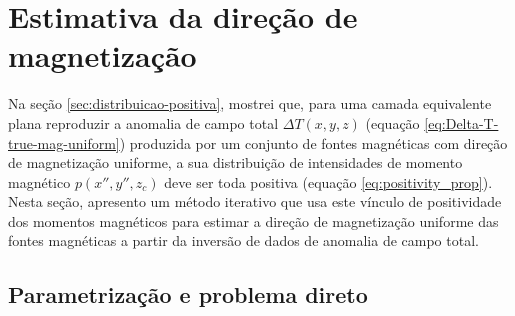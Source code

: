 \section{Estimativa da direção de magnetização}
\label{sec:mag_dir_est}

Na seção \ref{sec:distribuicao-positiva}, mostrei que, para uma camada equivalente plana 
reproduzir a anomalia de campo total $\Delta T(x, y, z)$ (equação \ref{eq:Delta-T-true-mag-uniform}) 
produzida por um conjunto de fontes magnéticas com direção de magnetização uniforme, a sua distribuição 
de intensidades de momento magnético $p(x'', y'', z_{c})$ 
deve ser toda positiva (equação \ref{eq:positivity_prop}). Nesta seção, apresento um método 
iterativo que usa este vínculo de positividade dos momentos magnéticos para estimar a direção de 
magnetização uniforme das fontes magnéticas a partir da inversão de dados de anomalia de campo total.

\subsection{Parametrização e problema direto}
\label{subsec:mag_dir_prob_dir}

